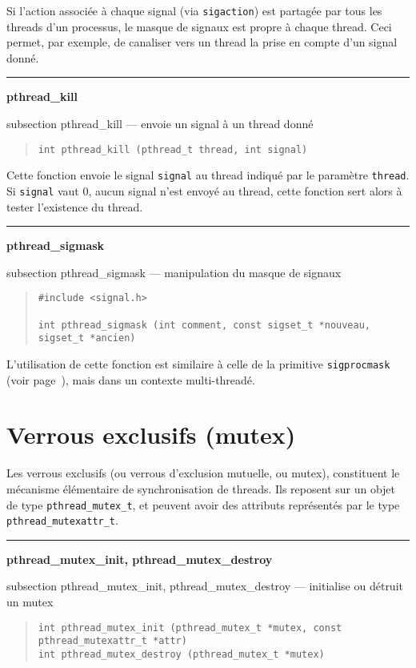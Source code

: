 \documentclass [twoside] {report}
\newcommand {\primitive} [1]
    {
	{\large \bf #1}
	\addcontentsline {toc} {subsection} {#1}
    }
\newcommand {\separation}
    {
	\vspace {7mm}
	\nopagebreak
	\hrule
    }
\begin{document}
Si l'action associée à chaque signal (via \texttt {sigaction}) est
partagée par tous les threads d'un processus, le masque de signaux est
propre à chaque thread. Ceci permet, par exemple, de canaliser vers un
thread la prise en compte d'un signal donné.


\separation 
\primitive {pthread\_kill} --- envoie un signal à un thread donné

\begin {quote}
\begin {verbatim}
int pthread_kill (pthread_t thread, int signal)
\end{verbatim}
\end {quote}

Cette fonction envoie le signal \texttt {signal} au thread indiqué par le
paramètre \texttt {thread}.  Si \texttt {signal} vaut 0, aucun signal
n'est envoyé au thread, cette fonction sert alors à tester l'existence
du thread.


\separation
\primitive {pthread\_sigmask} --- manipulation du masque de signaux

\begin {quote}
\begin {verbatim}
#include <signal.h>

int pthread_sigmask (int comment, const sigset_t *nouveau, sigset_t *ancien)
\end{verbatim}
\end {quote}

L'utilisation de cette fonction est similaire à celle de la primitive
\texttt {sigprocmask} (voir page~\pageref {sigprocmask}), mais dans un
contexte multi-threadé.


\section {Verrous exclusifs (mutex)}

Les verrous exclusifs (ou verrous d'exclusion mutuelle, ou mutex),
constituent le mécanisme élémentaire de synchronisation de threads. Ils
reposent sur un objet de type \verb|pthread_mutex_t|, et peuvent avoir
des attributs représentés par le type \verb|pthread_mutexattr_t|.

\separation
\primitive {pthread\_mutex\_init, pthread\_mutex\_destroy} --- initialise ou détruit un mutex

\begin {quote}
\begin {verbatim}
int pthread_mutex_init (pthread_mutex_t *mutex, const pthread_mutexattr_t *attr)
int pthread_mutex_destroy (pthread_mutex_t *mutex)
\end{verbatim}
\end {quote}
\end{document}

